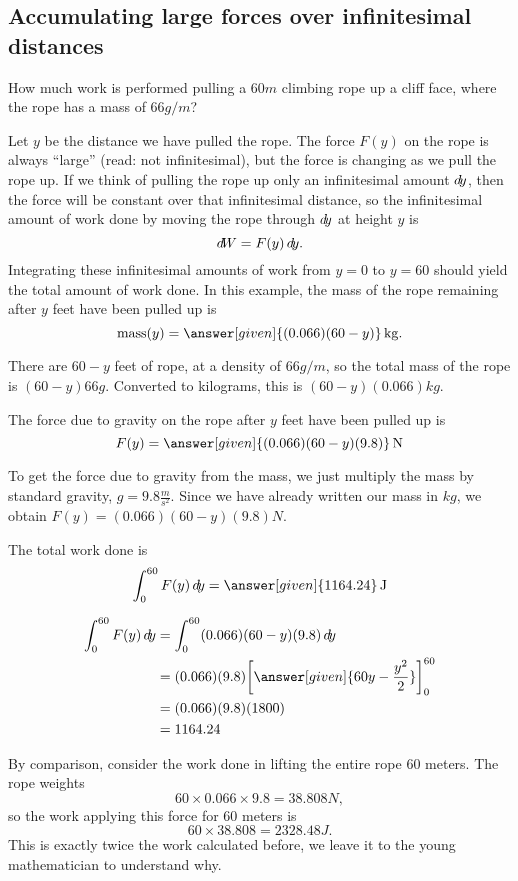\documentclass{ximera}
\begin{document}
\subsection{Accumulating large forces over infinitesimal distances}


\begin{example}
  How much work is performed pulling a $60\unit{m}$ climbing rope up a
  cliff face, where the rope has a mass of $66\unit{g}/\unit{m}$?
  \begin{explanation}
    Let $y$ be the distance we have pulled the rope.  The force $F(y)$
    on the rope is always ``large'' (read: not infinitesimal), but the
    force is changing as we pull the rope up.  If we think of pulling
    the rope up only an infinitesimal amount $\mathop{}\!d\! y$, then the force
    will be constant over that infinitesimal distance, so the
    infinitesimal amount of work done by moving the rope through $\mathop{}\!d\!
    y$ at height $y$ is
    \[
    \mathop{}\!d\! W = F(y) \mathop{}\!d\! y.
    \]
    Integrating these infinitesimal amounts of work from $y=0$ to
    $y=60$ should yield the total amount of work done.  In this
    example, the mass of the rope remaining after $y$ feet have been
    pulled up is
    \[
    \mathrm{mass}(y) = \answer[given]{(0.066)(60-y)} \unit{kg}.
    \]
    \begin{hint}
      There are $60-y$ feet of rope, at a density of $66\unit{g}/\unit{m}$, so
      the total mass of the rope is $(60-y)66\unit{g}$.  Converted to kilograms,
      this is $(60-y)(0.066)\unit{kg}$.
    \end{hint}
    The force due to gravity on the rope after $y$ feet have been pulled up is
    \[
    F(y) = \answer[given]{(0.066)(60-y)(9.8)} \unit{N} 
    \]
    \begin{hint}
      To get the force due to gravity from the mass, we just
      multiply the mass by standard gravity, $g = 9.8
      \frac{\unit{m}}{\unit{s}^2}$.  Since we have already written
      our mass in $\unit{kg}$, we obtain $F(y) = (0.066)(60-y)(9.8)
      \unit{N}$.
    \end{hint}
    The total work done is
    \[
    \int_0^{60} F(y) \d y = \answer[given]{1164.24} \unit{J}
    \]
    \begin{hint}
      \begin{align*}
	\int_0^{60} F(y) \d y &= \int_0^{60}(0.066)(60-y)(9.8) \d y \\
	&= (0.066)(9.8) \eval{\answer[given]{60y - \frac{y^2}{2}}}_0^{60}\\
	&=(0.066)(9.8)(1800)\\
	&= 1164.24
      \end{align*}
    \end{hint}    
    By comparison, consider the work done in lifting the entire rope
    $60$ meters. The rope weights
    \[
    60\times 0.066 \times 9.8 = 38.808\unit{N},
    \]
    so the work applying this force for $60$ meters is
    \[
    60\times 38.808 = 2328.48 \unit{J}.
    \]
    This is exactly twice the work calculated before, we leave it to
    the young mathematician to understand why.
  \end{explanation}
\end{example}
\end{document}
